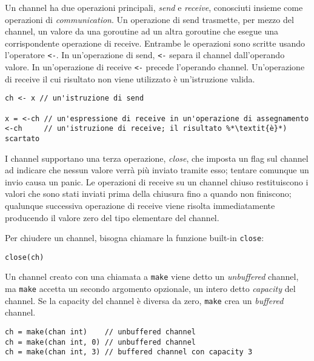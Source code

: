\documentclass[../../thesis.tex]{subfiles}
\begin{document}
    Un channel ha due operazioni principali, \textit{send} e \textit{receive}, conosciuti insieme come operazioni di \textit{communication}.
    Un operazione di send trasmette, per mezzo del channel, un valore da una goroutine ad un altra goroutine che esegue una corrispondente operazione di receive.
    Entrambe le operazioni sono scritte usando l'operatore \verb"<-".
    In un'operazione di send, \verb"<-" separa il channel dall'operando valore.
    In un'operazione di receive \verb"<-" precede l'operando channel.
    Un'operazione di receive il cui risultato non viene utilizzato è un'istruzione valida.
    \begin{lstlisting}[frame = single, label = {lst:lstlisting7-4.2}]
ch <- x // un'istruzione di send

x = <-ch // un'espressione di receive in un'operazione di assegnamento
<-ch     // un'istruzione di receive; il risultato %*\textit{è}*) scartato
    \end{lstlisting}
    I channel supportano una terza operazione, \textit{close}, che imposta un flag sul channel ad indicare che nessun valore verrà più inviato tramite esso;
    tentare comunque un invio causa un panic.
    Le operazioni di receive su un channel chiuso restituiscono i valori che sono stati inviati prima della chiusura fino a quando non finiscono;
    qualunque successiva operazione di receive viene risolta immediatamente producendo il valore zero del tipo elementare del channel.
    \hfill \vspace{12pt}

    Per chiudere un channel, bisogna chiamare la funzione built-in \verb"close":
    \begin{lstlisting}[frame = single, label = {lst:lstlisting7-4.3}]
close(ch)
    \end{lstlisting}
    Un channel creato con una chiamata a \verb"make" viene detto un \textit{unbuffered} channel, ma \verb"make" accetta un secondo argomento opzionale, un intero detto \textit{capacity} del channel.
    Se la capacity del channel è diversa da zero, \verb"make" crea un \textit{buffered} channel.
    \begin{lstlisting}[frame = single, label = {lst:lstlisting7-4.4}]
ch = make(chan int)    // unbuffered channel
ch = make(chan int, 0) // unbuffered channel
ch = make(chan int, 3) // buffered channel con capacity 3
    \end{lstlisting}
    
    
    
    
\end{document}
